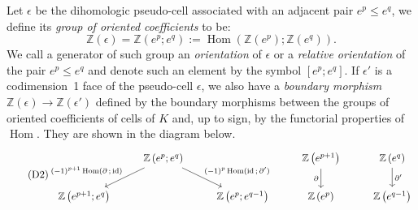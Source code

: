 \documentclass[AHL,Unicode,longabstracts,published]{cedram}
\newcommand{\Z}{\mathbb{Z}}
\DeclareMathOperator{\Hom}{Hom}
\DeclareMathOperator{\id}{id}
\begin{document}
\begin{defi}\label{definition:rel_or}
Let $\epsilon$ be the dihomologic pseu\-do-cell associated with an adjacent pair $e^p\leq e^q$, we define its \emph{group of oriented coefficients} to be:
\begin{equation*}
\Z(\epsilon)=\Z(e^p;e^q):=\Hom(\Z(e^p);\Z(e^q)).
\end{equation*}
We call a generator of such group an \emph{orientation} of $\epsilon$ or a \emph{relative orientation} of the pair $e^p\leq e^q$ and denote such an element by the symbol $[e^p; e^q]$. If $\epsilon'$ is a codimension~1 face of the pseudo-cell $\epsilon$, we also have a \emph{boundary morphism} $\Z(\epsilon)\rightarrow \Z(\epsilon')$ defined by the boundary morphisms between the groups of oriented coefficients of cells of $K$ and, up to sign, by the functorial properties of $\Hom$. They are shown in the diagram below.
\begin{equation}
\tag{D2}\label{diag:bound_mor}
\begin{tikzcd}
& \Z\left(e^p;e^q\right) \arrow[ld,"(-1)^{p+1}\Hom(\partial\,;\,\id)" above left] \arrow[rd,"(-1)^p\Hom(\id\,;\,\partial')" above right] & & \Z\left(e^{p+1}\right)\arrow[d,"\partial" left] & \Z\left(e^q\right) \arrow[d,"\partial'" right] \\ \Z\left(e^{p+1};e^q\right) & & \Z\left(e^p;e^{q-1}\right) & \Z\left(e^p\right) & \Z\left(e^{q-1}\right)
\end{tikzcd}
\end{equation}
\end{defi}
\end{document}
